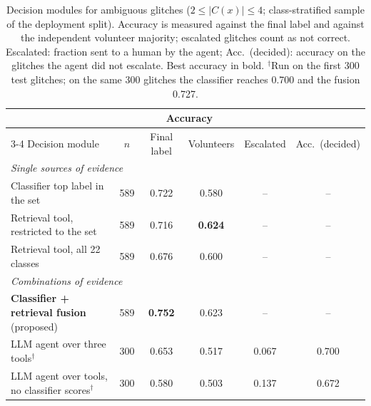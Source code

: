 \begin{table}[!htbp]
\caption{Decision modules for ambiguous glitches ($2\le|C(x)|\le4$; class-stratified sample of the deployment split).
Accuracy is measured against the final label and against the independent volunteer majority; escalated glitches count as not
correct. Escalated: fraction sent to a human by the agent; Acc.\ (decided): accuracy on the glitches the agent did not escalate.
Best accuracy in bold. $^\dagger$Run on the first 300 test glitches; on the same 300 glitches the classifier reaches 0.700 and
the fusion 0.727.}\label{tab:e6}
\centering\footnotesize\setlength{\tabcolsep}{4pt}
\begin{tabular}{lccccc}\toprule
 & & \multicolumn{2}{c}{Accuracy} & & \\\cmidrule(lr){3-4}
Decision module & $n$ & Final label & Volunteers & Escalated & Acc.\ (decided)\\\midrule
\multicolumn{6}{l}{\emph{Single sources of evidence}}\\
Classifier top label in the set & 589 & 0.722 & 0.580 & -- & --\\
Retrieval tool, restricted to the set & 589 & 0.716 & \textbf{0.624} & -- & --\\
Retrieval tool, all 22 classes & 589 & 0.676 & 0.600 & -- & --\\
\midrule
\multicolumn{6}{l}{\emph{Combinations of evidence}}\\
\textbf{Classifier + retrieval fusion} (proposed) & 589 & \textbf{0.752} & 0.623 & -- & --\\
LLM agent over three tools$^\dagger$ & 300 & 0.653 & 0.517 & 0.067 & 0.700\\
LLM agent over tools, no classifier scores$^\dagger$ & 300 & 0.580 & 0.503 & 0.137 & 0.672\\
\bottomrule
\end{tabular}
\end{table}
